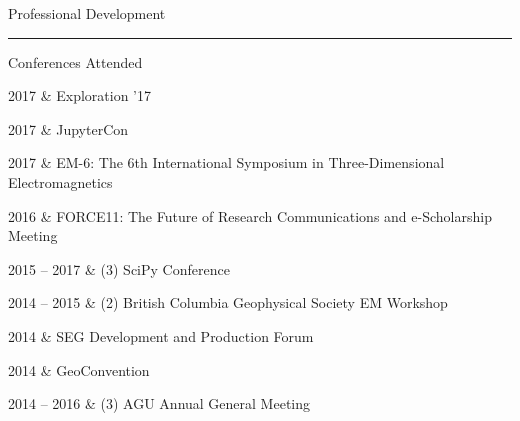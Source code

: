 \documentclass[oneside]{cv}
\newcommand{\heading}[1]{
    \vspace{0.7cm}
    {\HelveticaNeueUltraLight\fontsize{18pt}{0}\selectfont #1}\\
    \vspace{-0.2cm}
    \hrule
    \vspace{0.4cm}
}
\newcommand{\subheading}[1]{
    \vspace{0.4cm}
    {\HelveticaNeueUltraLight\fontsize{14pt}{0}\selectfont #1}\\
    \vspace{-0.1cm}
}
\begin{document}



\heading{Professional Development}


\subheading{Conferences Attended}
\begin{entryright}
    2017         & Exploration '17
\end{entryright}

\begin{entryright}
    2017         & JupyterCon
\end{entryright}

\begin{entryright}
    2017         & EM-6: The 6th International Symposium in Three-Dimensional Electromagnetics
\end{entryright}

\begin{entryright}
    2016         & FORCE11: The Future of Research Communications and e-Scholarship Meeting
\end{entryright}

\begin{entryright}
    2015 -- 2017 & (3) SciPy Conference
\end{entryright}

\begin{entryright}
    2014 -- 2015 & (2) British Columbia Geophysical Society EM Workshop
\end{entryright}

\begin{entryright}
    2014         & SEG Development and Production Forum
\end{entryright}

\begin{entryright}
    2014         & GeoConvention
\end{entryright}

\begin{entryright}
    2014 -- 2016 & (3) AGU Annual General Meeting
\end{entryright}
\end{document}
